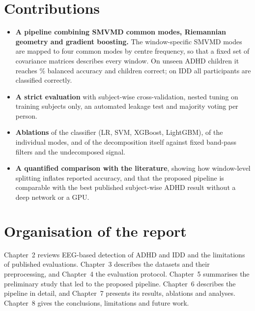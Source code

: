\section{Contributions}
\begin{itemize}
\item \textbf{A pipeline combining SMVMD common modes, Riemannian geometry and gradient
      boosting.} The window-specific SMVMD modes are mapped to four common modes by centre
      frequency, so that a fixed set of covariance matrices describes every window. On unseen
      ADHD children it reaches \% balanced accuracy and 
      children correct; on IDD all participants are classified correctly.
\item \textbf{A strict evaluation} with subject-wise cross-validation, nested tuning on
      training subjects only, an automated leakage test and majority voting per person.
\item \textbf{Ablations} of the classifier (LR, SVM, XGBoost, LightGBM), of the individual
      modes, and of the decomposition itself against fixed band-pass filters and the undecomposed
      signal.
\item \textbf{A quantified comparison with the literature}, showing how window-level splitting
      inflates reported accuracy, and that the proposed pipeline is comparable with the best
      published subject-wise ADHD result without a deep network or a GPU.
\end{itemize}

\section{Organisation of the report}
Chapter~2 reviews EEG-based detection of ADHD and IDD and the limitations of published
evaluations. Chapter~3 describes the datasets and their preprocessing, and Chapter~4 the
evaluation protocol. Chapter~5 summarises the preliminary study that led to the proposed
pipeline. Chapter~6 describes the pipeline in detail, and Chapter~7 presents its results,
ablations and analyses. Chapter~8 gives the conclusions, limitations and future work.
